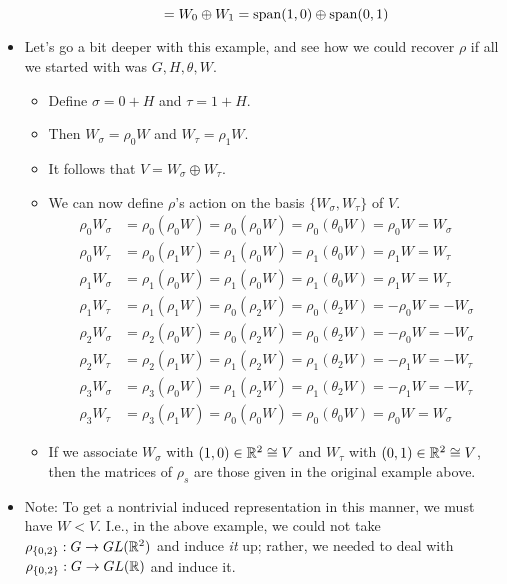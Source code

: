 \documentclass[../notes.tex]{subfiles}
\begin{document}
\begin{itemize}
\begin{itemize}
\begin{equation*}
            = W_0\oplus W_1
            = \operatorname{span}(1,0)\oplus\operatorname{span}(0,1)
        \end{equation*}
    \end{itemize}
    \item Let's go a bit deeper with this example, and see how we could recover $\rho$ if all we started with was $G,H,\theta,W$.
    \begin{itemize}
        \item Define $\sigma=0+H$ and $\tau=1+H$.
        \item Then $W_\sigma=\rho_0W$ and $W_\tau=\rho_1W$.
        \item It follows that $V=W_\sigma\oplus W_\tau$.
        \item We can now define $\rho$'s action on the basis $\{W_\sigma,W_\tau\}$ of $V$.
        \begin{align*}
            \rho_0W_\sigma &= \rho_0(\rho_0W) = \rho_0(\rho_0W) = \rho_0(\theta_0W) = \rho_0W  =  W_\sigma\\
            \rho_0W_\tau   &= \rho_0(\rho_1W) = \rho_1(\rho_0W) = \rho_1(\theta_0W) = \rho_1W  =  W_\tau  \\
            \rho_1W_\sigma &= \rho_1(\rho_0W) = \rho_1(\rho_0W) = \rho_1(\theta_0W) = \rho_1W  =  W_\tau  \\
            \rho_1W_\tau   &= \rho_1(\rho_1W) = \rho_0(\rho_2W) = \rho_0(\theta_2W) = -\rho_0W = -W_\sigma\\
            \rho_2W_\sigma &= \rho_2(\rho_0W) = \rho_0(\rho_2W) = \rho_0(\theta_2W) = -\rho_0W = -W_\sigma\\
            \rho_2W_\tau   &= \rho_2(\rho_1W) = \rho_1(\rho_2W) = \rho_1(\theta_2W) = -\rho_1W = -W_\tau  \\
            \rho_3W_\sigma &= \rho_3(\rho_0W) = \rho_1(\rho_2W) = \rho_1(\theta_2W) = -\rho_1W = -W_\tau  \\
            \rho_3W_\tau   &= \rho_3(\rho_1W) = \rho_0(\rho_0W) = \rho_0(\theta_0W) = \rho_0W  =  W_\sigma
        \end{align*}
        \item If we associate $W_\sigma$ with $(1,0)\in\mathbb{R}^2\cong V$ and $W_\tau$ with $(0,1)\in\mathbb{R}^2\cong V$, then the matrices of $\rho_s$ are those given in the original example above.
    \end{itemize}
    \item Note: To get a nontrivial induced representation in this manner, we must have $W<V$. I.e., in the above example, we could not take $\rho_{\{0,2\}}:G\to GL(\mathbb{R}^2)$ and induce \emph{it} up; rather, we needed to deal with $\rho_{\{0,2\}}:G\to GL(\mathbb{R})$ and induce it.

\end{itemize}
\end{document}
